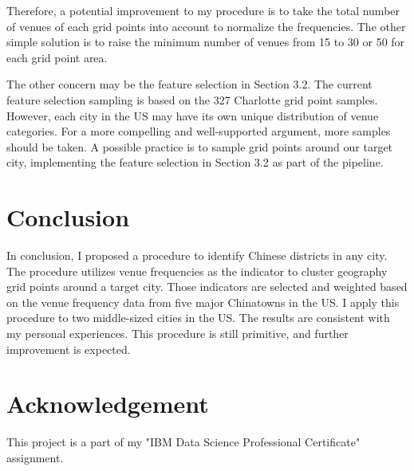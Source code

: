 \documentclass{article}
\begin{document}
Therefore, a potential improvement to my procedure is to take the total number of venues of each grid points into account to normalize the frequencies.
The other simple solution is to raise the minimum number of venues from 15 to 30 or 50 for each grid point area.

The other concern may be the feature selection in Section 3.2.
The current feature selection sampling is based on the 327 Charlotte grid point samples.
However, each city in the US may have its own unique distribution of venue categories.
For a more compelling and well-supported argument, more samples should be taken.
A possible practice is to sample grid points around our target city, implementing the feature selection in Section 3.2 as part of the pipeline.

\section{Conclusion}
In conclusion, I proposed a procedure to identify Chinese districts in any city.
The procedure utilizes venue frequencies as the indicator to cluster geography grid points around a target city.
Those indicators are selected and weighted based on the venue frequency data from five major Chinatowns in the US.
I apply this procedure to two middle-sized cities in the US. The results are consistent with my personal experiences.
This procedure is still primitive, and further improvement is expected.

\section{Acknowledgement}
This project is a part of my "IBM Data Science Professional Certificate" assignment.

\newpage



\end{document}
